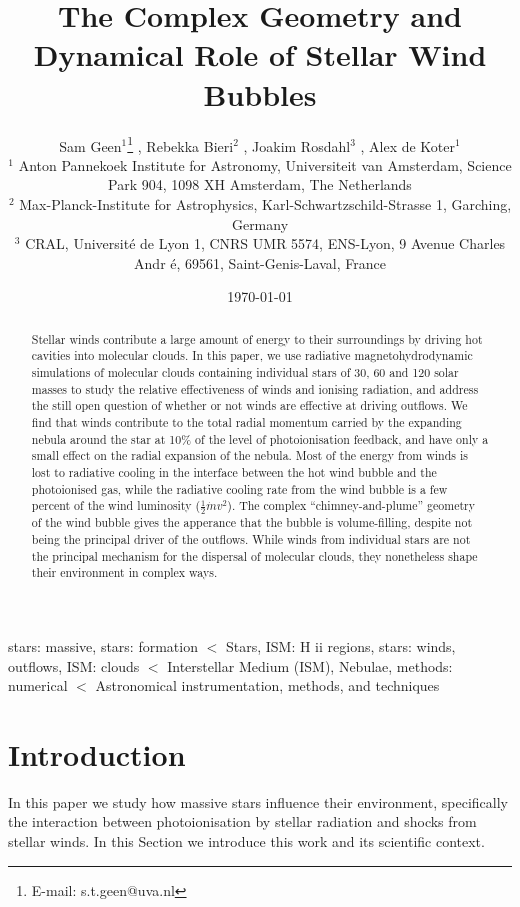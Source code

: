 \documentclass[a4paper,fleqn,usenatbib]{mnras}
\title[The Complexity of Wind Bubbles]{The Complex Geometry and Dynamical Role of Stellar Wind Bubbles}
\author[Geen et al]{
Sam Geen$^{1}$\thanks{E-mail: s.t.geen@uva.nl} \href{https://orcid.org/0000-0002-3150-2543}{\textcolor{orcidlogocol}{\aiOrcid}},
Rebekka Bieri$^{2}$ \href{https://orcid.org/0000-0002-4554-4488}{\textcolor{orcidlogocol}{\aiOrcid}},
Joakim Rosdahl$^{3}$ \href{https://orcid.org/0000-0002-7534-8314}{\textcolor{orcidlogocol}{\aiOrcid}},
Alex de Koter$^{1}$ \href{https://orcid.org/0000-0002-1198-3167}{\textcolor{orcidlogocol}{\aiOrcid}}
\\
$^{1}$ Anton Pannekoek Institute for Astronomy, Universiteit van Amsterdam, Science Park 904, 1098 XH Amsterdam, The Netherlands\\
$^{2}$ Max-Planck-Institute for Astrophysics, Karl-Schwartzschild-Strasse 1, Garching, Germany\\
$^{3}$ CRAL, Universit\'e de Lyon 1, CNRS UMR 5574, ENS-Lyon, 9 Avenue Charles Andr \'e, 69561, Saint-Genis-Laval, France\\
}
\date{\today}
\begin{document}
\label{firstpage}
\pagerange{\pageref{firstpage}--\pageref{lastpage}}
\maketitle

\begin{abstract}
Stellar winds contribute a large amount of energy to their surroundings by driving hot cavities into molecular clouds. In this paper, we use radiative magnetohydrodynamic simulations of molecular clouds containing individual stars of 30, 60 and 120 solar masses to study the relative effectiveness of winds and ionising radiation, and address the still open question of whether or not winds are effective at driving outflows. We find that winds contribute to the total radial momentum carried by the expanding nebula around the star at 10\% of the level of photoionisation feedback, and have only a small effect on the radial expansion of the nebula. Most of the energy from winds is lost to radiative cooling in the interface between the hot wind bubble and the photoionised gas, while the radiative cooling rate from the wind bubble is a few percent of the wind luminosity ($\frac{1}{2} \dot{m} v^2$). The complex ``chimney-and-plume'' geometry of the wind bubble gives the apperance that the bubble is volume-filling, despite not being the principal driver of the outflows. While winds from individual stars are not the principal mechanism for the dispersal of molecular clouds, they nonetheless shape their environment in complex ways.
\end{abstract}

\begin{keywords}
stars: massive, 
stars: formation $<$ Stars, 
ISM: H ii regions, 
stars: winds, outflows,
ISM: clouds $<$ Interstellar Medium (ISM), Nebulae,
methods: numerical $<$ Astronomical instrumentation, methods, and techniques
\end{keywords}



\section{Introduction}
\label{introduction}

In this paper we study how massive stars influence their environment, specifically the interaction between photoionisation by stellar radiation and shocks from stellar winds. In this Section we introduce this work and its scientific context.
\end{document}
